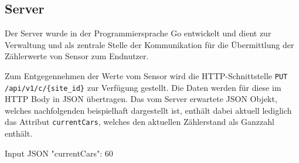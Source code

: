 \subsection{Server}\label{ch:Umsetzung_Server}

Der Server wurde in der Programmiersprache Go entwickelt und dient zur Verwaltung und als zentrale Stelle der Kommunikation für die Übermittlung der Zählerwerte von Sensor zum Endnutzer.

Zum Entgegennehmen der Werte vom Sensor wird die HTTP-Schnittstelle \lstinline|PUT /api/v1/c/{site_id}| zur Verfügung gestellt.
Die Daten werden für diese im HTTP Body in JSON übertragen.
Das vom Server erwartete JSON Objekt, welches nachfolgenden beispielhaft dargestellt ist, enthält dabei aktuell lediglich das Attribut \lstinline|currentCars|, welches den aktuellen Zählerstand als Ganzzahl enthält.

\lstset{language=json, numbers=none}
\begin{center}
    \begin{mylisting}{Input JSON}
{
    "currentCars": 60
}
    \end{mylisting}
\end{center}

